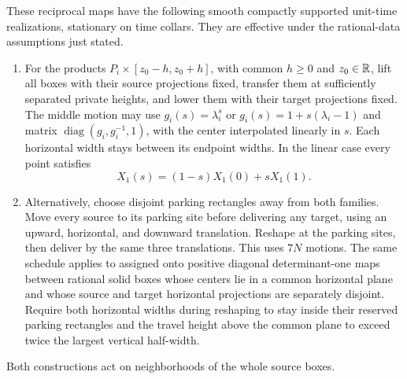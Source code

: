 \begin{lemma}
\label{lem:bb-lift-parking}
These reciprocal maps have the following smooth compactly supported
unit-time realizations, stationary on time collars. They are effective
under the rational-data assumptions just stated.
\begin{enumerate}
\item For the products $P_i\times[z_0-h,z_0+h]$, with common $h\ge0$
and $z_0\in\mathbb R$, lift all boxes with their source projections fixed,
transfer them at sufficiently separated private heights, and lower
them with their target projections fixed.  The middle motion may use
$g_i(s)=\lambda_i^s$ or $g_i(s)=1+s(\lambda_i-1)$ and matrix
$\operatorname{diag}(g_i,g_i^{-1},1)$, with the center interpolated
linearly in $s$.  Each horizontal width stays between its endpoint
widths.  In the linear case every point satisfies
\begin{equation}\label{eq:bb-convex-coordinate}
 X_1(s)=(1-s)X_1(0)+sX_1(1).
\end{equation}
\item Alternatively, choose disjoint parking rectangles away from both
families.  Move every source to its parking site before delivering any
target, using an upward, horizontal, and downward translation.  Reshape
at the parking sites, then deliver by the same three translations.
This uses $7N$ motions. The same schedule applies to assigned onto positive
diagonal determinant-one maps between rational solid boxes whose centers
lie in a common horizontal plane and whose source and target horizontal
projections are separately disjoint. Require both horizontal widths during
reshaping to stay inside their reserved parking rectangles and the travel
height above the common plane to exceed twice the largest vertical
half-width.
\end{enumerate}
Both constructions act on neighborhoods of the whole source boxes.
\end{lemma}
